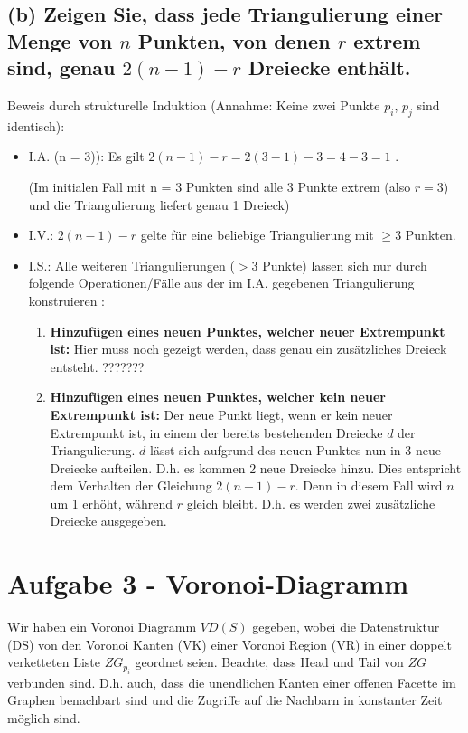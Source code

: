 \documentclass[a4paper]{article}
\begin{document}
\subsection*{(b) Zeigen Sie, dass jede Triangulierung einer Menge von $n$ Punkten, von denen $r$ extrem sind, genau $2 (n - 1) - r$ Dreiecke enthält.}

Beweis durch strukturelle Induktion (Annahme: Keine zwei Punkte $p_i$, $p_j$ sind identisch):

\begin{itemize}
	\item I.A. (n = 3)): Es gilt $2 (n - 1) - r = 2 (3 - 1) - 3 = 4 - 3 = 1$ . \checkmark
	
	(Im initialen Fall mit  n = 3 Punkten sind alle 3 Punkte extrem (also $r = 3$) und die Triangulierung liefert genau 1 Dreieck) 
	\item I.V.: $2 (n - 1) - r$ gelte für eine beliebige Triangulierung mit $\geq 3$ Punkten.
	\item I.S.: Alle weiteren Triangulierungen ($> 3$ Punkte) lassen sich nur durch folgende Operationen/Fälle aus der im I.A. gegebenen Triangulierung konstruieren :
	\begin{enumerate}
		\item \textbf{Hinzufügen eines neuen Punktes, welcher neuer Extrempunkt ist:}
			Hier muss noch gezeigt werden, dass genau ein zusätzliches Dreieck entsteht.
			???????
		\item \textbf{Hinzufügen eines neuen Punktes, welcher kein neuer Extrempunkt ist:}
			Der neue Punkt liegt, wenn er kein neuer Extrempunkt ist, in einem der 
			bereits bestehenden Dreiecke $d$ der Triangulierung. $d$ lässt sich aufgrund
			des neuen Punktes nun in 3 neue Dreiecke aufteilen. D.h. es kommen 2 neue Dreiecke hinzu. Dies entspricht dem Verhalten 	der Gleichung $2 (n - 1) - r$. Denn in diesem Fall wird $n$ um 1 erhöht, während $r$ gleich bleibt. D.h. es werden zwei zusätzliche Dreiecke ausgegeben. \checkmark
	\end{enumerate}
\end{itemize}


\section*{Aufgabe 3 - Voronoi-Diagramm}


Wir haben ein Voronoi Diagramm $VD(S)$ gegeben, wobei die Datenstruktur (DS) von den Voronoi Kanten (VK) einer Voronoi Region (VR) in einer doppelt verketteten Liste $ZG_{p_i}$ geordnet seien. Beachte, dass Head und Tail von $ZG$ verbunden sind. D.h. auch, dass die unendlichen Kanten einer offenen Facette im Graphen benachbart sind und die Zugriffe auf die Nachbarn in konstanter Zeit möglich sind.
\end{document}
